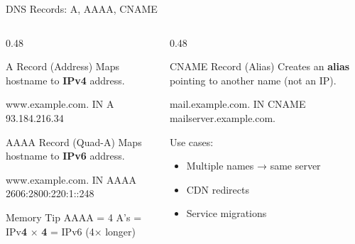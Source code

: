 \documentclass[aspectratio=169, 11pt]{beamer}
\begin{document}
\begin{frame}{DNS Records: A, AAAA, CNAME}
    \begin{columns}[T]
        \begin{column}{0.48\textwidth}
            \begin{block}{A Record (Address)}
                \small
                Maps hostname to \textbf{IPv4} address.
                
                \vspace{0.2em}
                \ttfamily\footnotesize
                www.example.com. IN A 93.184.216.34
            \end{block}
            
            \vspace{0.2em}
            \begin{block}{AAAA Record (Quad-A)}
                \small
                Maps hostname to \textbf{IPv6} address.
                
                \vspace{0.2em}
                \ttfamily\footnotesize
                www.example.com. IN AAAA 2606:2800:220:1::248
            \end{block}
            
            \vspace{0.2em}
            \begin{alertblock}{Memory Tip}
                \small
                AAAA = 4 A's = IPv\textbf{4} × \textbf{4} = IPv6 (4× longer)
            \end{alertblock}
        \end{column}
        \begin{column}{0.48\textwidth}
            \begin{block}{CNAME Record (Alias)}
                \small
                Creates an \textbf{alias} pointing to another name (not an IP).
                
                \vspace{0.2em}
                \ttfamily\footnotesize
                mail.example.com. IN CNAME \\
                \hspace{1em}mailserver.example.com.
                
                \vspace{0.3em}
                \normalfont\small
                Use cases:
                \begin{itemize}\setlength{\itemsep}{1pt}
                    \item Multiple names → same server
                    \item CDN redirects
                    \item Service migrations
                \end{itemize}
            \end{block}
            

\end{column}
\end{columns}
\end{frame}
\end{document}
